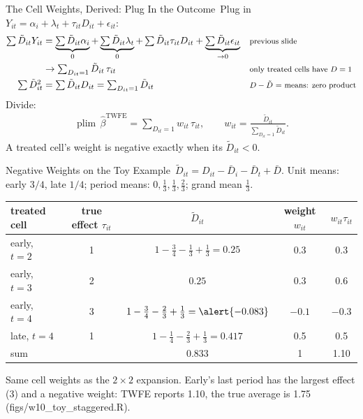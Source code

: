 \documentclass[aspectratio=169,11pt,xcolor=dvipsnames]{beamer}
\newcommand{\srcp}[1]{{\scriptsize\color{gray}(#1)}}
\DeclareMathOperator{\plim}{plim}
\newcommand{\adv}{\,\raisebox{0.6pt}{\textcolor{accent}{$\bigstar$}}}
\begin{document}
\begin{frame}{The Cell Weights, Derived: Plug In the Outcome\adv}
Plug in $Y_{it} = \alpha_i + \lambda_t + \tau_{it} D_{it} + \epsilon_{it}$:
\begin{align*}
  \textstyle\sum\tilde D_{it} Y_{it}
  &= \underbrace{\textstyle\sum\tilde D_{it}\alpha_i}_{0}
   + \underbrace{\textstyle\sum\tilde D_{it}\lambda_t}_{0}
   + \textstyle\sum\tilde D_{it}\tau_{it} D_{it}
   + \underbrace{\textstyle\sum\tilde D_{it}\epsilon_{it}}_{\to 0}
   && \text{\footnotesize previous slide} \\
  &\to \textstyle\sum_{D_{it}=1} \tilde D_{it}\,\tau_{it}
   && \text{\footnotesize only treated cells have $D = 1$} \\
  \textstyle\sum\tilde D_{it}^2
  &= \textstyle\sum\tilde D_{it} D_{it} = \textstyle\sum_{D_{it}=1}\tilde D_{it}
   && \text{\footnotesize $D - \tilde D$ = means: zero product}
\end{align*}
Divide:
\begin{align*}
  \plim\,\hat\beta^{\text{TWFE}}
  = \sum_{D_{it}=1} w_{it}\,\tau_{it},
  \qquad
  w_{it} = \frac{\tilde D_{it}}{\sum_{D_{it}=1}\tilde D_{it}} .
\end{align*}
\alert{A treated cell's weight is negative exactly when its $\tilde D_{it} < 0$.}
\end{frame}

\begin{frame}{Negative Weights on the Toy Example\adv}
$\tilde D_{it} = D_{it} - \bar D_i - \bar D_t + \bar D$. Unit means: early $3/4$, late $1/4$; period
means: $0, \tfrac13, \tfrac13, \tfrac23$; grand mean $\tfrac13$.
\vskip3pt
\begin{center}\small
\renewcommand{\arraystretch}{1.15}
\begin{tabular}{@{}lcccc@{}}
\toprule
treated cell & true effect $\tau_{it}$ & $\tilde D_{it}$ & weight $w_{it}$ & $w_{it}\tau_{it}$ \\
\midrule
early, $t = 2$ & 1 & $1 - \tfrac34 - \tfrac13 + \tfrac13 = 0.25$ & 0.3 & 0.3 \\
early, $t = 3$ & 2 & $0.25$ & 0.3 & 0.6 \\
\alert{early, $t = 4$} & 3 & $1 - \tfrac34 - \tfrac23 + \tfrac13 = \alert{-0.083}$ & \alert{$-0.1$} & $-0.3$ \\
late, $t = 4$ & 1 & $1 - \tfrac14 - \tfrac23 + \tfrac13 = 0.417$ & 0.5 & 0.5 \\
\midrule
sum & & 0.833 & 1 & \alert{1.10} \\
\bottomrule
\end{tabular}
\end{center}
\vskip2pt
Same cell weights as the $2\times2$ expansion. Early's last period has the largest effect (3) and a
\alert{negative} weight: TWFE reports 1.10, the true average is 1.75 \srcp{figs/w10\_toy\_staggered.R}.
\end{frame}
\end{document}
